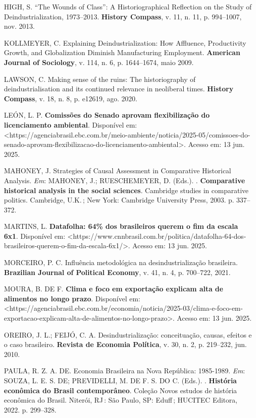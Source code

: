 HIGH, S. ``The Wounds of Class'': A Historiographical Reflection on the
Study of Deindustrialization, 1973--2013. \textbf{History Compass}, v.
11, n. 11, p. 994--1007, nov. 2013.

KOLLMEYER, C. Explaining Deindustrialization: How Affluence,
Productivity Growth, and Globalization Diminish Manufacturing
Employment. \textbf{American Journal of Sociology}, v. 114, n. 6, p.
1644--1674, maio 2009.

LAWSON, C. Making sense of the ruins: The historiography of
deindustrialisation and its continued relevance in neoliberal times.
\textbf{History Compass}, v. 18, n. 8, p. e12619, ago. 2020.

LEÓN, L. P. \textbf{Comissões do Senado aprovam flexibilização do
licenciamento ambiental}. Disponível em:
\textless https://agenciabrasil.ebc.com.br/meio-ambiente/noticia/2025-05/comissoes-do-senado-aprovam-flexibilizacao-do-licenciamento-ambiental\textgreater.
Acesso em: 13 jun. 2025.

MAHONEY, J. Strategies of Causal Assessment in Comparative Historical
Analysis. \emph{Em}: MAHONEY, J.; RUESCHEMEYER, D. (Eds.). .
\textbf{Comparative historical analysis in the social sciences}.
Cambridge studies in comparative politics. Cambridge, U.K.\,; New York:
Cambridge University Press, 2003. p. 337--372.

MARTINS, L. \textbf{Datafolha: 64\% dos brasileiros querem o fim da
escala 6x1}. Disponível em:
\textless https://www.cnnbrasil.com.br/politica/datafolha-64-dos-brasileiros-querem-o-fim-da-escala-6x1/\textgreater.
Acesso em: 13 jun. 2025.

MORCEIRO, P. C. Influência metodológica na desindustrialização
brasileira. \textbf{Brazilian Journal of Political Economy}, v. 41, n.
4, p. 700--722, 2021.

MOURA, B. DE F. \textbf{Clima e foco em exportação explicam alta de
alimentos no longo prazo}. Disponível em:
\textless https://agenciabrasil.ebc.com.br/economia/noticia/2025-03/clima-e-foco-em-exportacao-explicam-alta-de-alimentos-no-longo-prazo\textgreater.
Acesso em: 13 jun. 2025.

OREIRO, J. L.; FEIJÓ, C. A. Desindustrialização: conceituação, causas,
efeitos e o caso brasileiro. \textbf{Revista de Economia Política}, v.
30, n. 2, p. 219--232, jun. 2010.

PAULA, R. Z. A. DE. Economia Brasileira na Nova República: 1985-1989.
\emph{Em}: SOUZA, L. E. S. DE; PREVIDELLI, M. DE F. S. DO C. (Eds.). .
\textbf{História econômica do Brasil contemporâneo}. Coleção Novos
estudos de história econômica do Brasil. Niterói, RJ\,: São Paulo, SP:
Eduff\,; HUCITEC Editora, 2022. p. 299--328.

